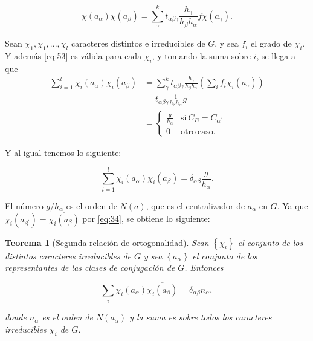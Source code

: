 \documentclass[12pt]{book}
\newtheorem{theorem}{Teorema}[section]
\theoremstyle{definition}
\newcounter{in}
\begin{document}
\begin{equation}
  \label{eq:53}
   \chi(a_{\alpha}) \chi(a_{\beta}) = \sum_{\gamma}^{k} t_{\alpha \beta \gamma} \frac{h_{\gamma}}{h_{\beta} h_{\alpha}} f \chi(a_{\gamma}).
\end{equation}

Sean $\chi_{1}, \chi_{1},..., \chi_{l}$ caracteres distintos e
irreducibles de $G$, y sea $f_{i}$ el grado de $\chi_{i}$. Y además
\ref{eq:53} es válida para cada $\chi_{i}$, y tomando la suma sobre
$i$, se llega a que
\begin{equation}
  \label{eq:54}
  \begin{aligned}
    \sum_{i=1}^{l} \chi_{i}(a_{\alpha}) \chi_{i}(a_{\beta}) &= \sum_{\gamma}^{k} t_{\alpha \beta \gamma} \frac{h_{\gamma}}{h_{\beta} h_{\alpha}} (\sum_{i} f_{i} \chi_{i}(a_{\gamma})) \\
    &= t_{\alpha \beta \gamma} \frac{1}{h_{\beta} h_{\alpha}}g \\
    &=  \left\{
	       \begin{array}{ll}
		 \frac{g}{h_{\alpha}}      & \mathrm{si\ } C_{B} = C_{\alpha^{'}} \\
		 0      & \mathrm{otro\ caso.\ } 
	       \end{array}
	     \right.
    \end{aligned}
\end{equation}

Y al igual tenemos lo siguiente:

\begin{equation}
  \label{eq:55}
   \sum_{i=1}^{l} \chi_{i}(a_{\alpha}) \chi_{i}(a_{\beta})=\delta_{\alpha \beta} \frac{g}{h_{\alpha}}.
\end{equation}

El número $g/h_{\alpha}$ es el orden de $N(a)$, que es el
centralizador de $a_{\alpha}$ en $G$. Ya que
$\chi_{i}(a_{\beta^{'}})=\overline{\chi_{i} (a_{\beta})}$ por
\ref{eq:34}, se obtiene lo siguiente:

\begin{theorem}[Segunda relación de ortogonalidad]
  \label{t4_9}
  Sean $\left\{\chi_{i} \right\}$ el conjunto de los distintos
  caracteres irreducibles de $G$ y sea $\left\{a_{\alpha} \right\}$ el
  conjunto de los representantes de las clases de conjugación de
  $G$. Entonces

\begin{equation*}
  \sum_{i} \chi_{i}(a_{\alpha}) \overline{\chi_{i} (a_{\beta})} = \delta_{\alpha \beta} n_{\alpha},
\end{equation*}

donde $n_{\alpha}$ es el orden de $N(a_{\alpha})$ y la suma es sobre
todos los caracteres irreducibles $\chi_{i}$ de $G$.
\end{theorem}
\end{document}
